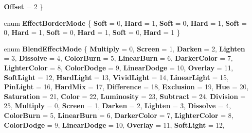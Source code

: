 \begin{DoxyCompactItemize}
{\bfseries Offset} = 2
 \}
\item 
\mbox{\label{namespace_microsoft_1_1_graphics_1_1_canvas_1_1_effects_af071f1b230fa4fc760f6db8e5ad7d9db}} 
enum {\bfseries Effect\+Border\+Mode} \{ \newline
{\bfseries Soft} = 0, 
{\bfseries Hard} = 1, 
{\bfseries Soft} = 0, 
{\bfseries Hard} = 1, 
\newline
{\bfseries Soft} = 0, 
{\bfseries Hard} = 1, 
{\bfseries Soft} = 0, 
{\bfseries Hard} = 1, 
\newline
{\bfseries Soft} = 0, 
{\bfseries Hard} = 1
 \}
\item 
\mbox{\label{namespace_microsoft_1_1_graphics_1_1_canvas_1_1_effects_a2cba8d6181059b5f496c6734b739752e}} 
enum {\bfseries Blend\+Effect\+Mode} \{ \newline
{\bfseries Multiply} = 0, 
{\bfseries Screen} = 1, 
{\bfseries Darken} = 2, 
{\bfseries Lighten} = 3, 
\newline
{\bfseries Dissolve} = 4, 
{\bfseries Color\+Burn} = 5, 
{\bfseries Linear\+Burn} = 6, 
{\bfseries Darker\+Color} = 7, 
\newline
{\bfseries Lighter\+Color} = 8, 
{\bfseries Color\+Dodge} = 9, 
{\bfseries Linear\+Dodge} = 10, 
{\bfseries Overlay} = 11, 
\newline
{\bfseries Soft\+Light} = 12, 
{\bfseries Hard\+Light} = 13, 
{\bfseries Vivid\+Light} = 14, 
{\bfseries Linear\+Light} = 15, 
\newline
{\bfseries Pin\+Light} = 16, 
{\bfseries Hard\+Mix} = 17, 
{\bfseries Difference} = 18, 
{\bfseries Exclusion} = 19, 
\newline
{\bfseries Hue} = 20, 
{\bfseries Saturation} = 21, 
{\bfseries Color} = 22, 
{\bfseries Luminosity} = 23, 
\newline
{\bfseries Subtract} = 24, 
{\bfseries Division} = 25, 
{\bfseries Multiply} = 0, 
{\bfseries Screen} = 1, 
\newline
{\bfseries Darken} = 2, 
{\bfseries Lighten} = 3, 
{\bfseries Dissolve} = 4, 
{\bfseries Color\+Burn} = 5, 
\newline
{\bfseries Linear\+Burn} = 6, 
{\bfseries Darker\+Color} = 7, 
{\bfseries Lighter\+Color} = 8, 
{\bfseries Color\+Dodge} = 9, 
\newline
{\bfseries Linear\+Dodge} = 10, 
{\bfseries Overlay} = 11, 
{\bfseries Soft\+Light} = 12, 

\end{DoxyCompactItemize}
